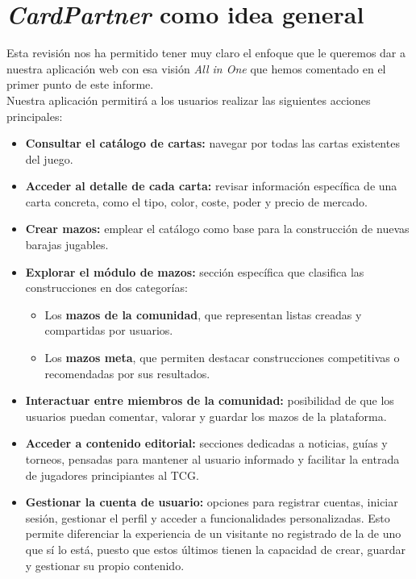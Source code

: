 \documentclass[10pt]{article}
\begin{document}
	\section{\textit{CardPartner} como idea general}        
	Esta revisión nos ha permitido tener muy claro el enfoque que le queremos dar a nuestra aplicación web
	con esa visión \textit{All in One} que hemos comentado en el primer punto de este informe.\\
	
	Nuestra aplicación permitirá a los usuarios realizar las siguientes acciones principales:
	\begin{itemize}
		\item \textbf{Consultar el catálogo de cartas:} navegar por todas las cartas existentes del juego.
		\item \textbf{Acceder al detalle de cada carta:} revisar información específica de una carta concreta, como el tipo, color, coste, poder y precio de mercado.
		\item \textbf{Crear mazos:} emplear el catálogo como base para la construcción de nuevas barajas jugables.
		\item \textbf{Explorar el módulo de mazos:} sección específica que clasifica las construcciones en dos categorías:
		\begin{itemize}
			\item Los \textbf{mazos de la comunidad}, que representan listas creadas y compartidas por usuarios.
			\item Los \textbf{mazos meta}, que permiten destacar construcciones competitivas o recomendadas por sus resultados.
		\end{itemize}
		\item \textbf{Interactuar entre miembros de la comunidad:} posibilidad de que los usuarios puedan comentar, valorar y guardar los mazos de la plataforma.
		\item \textbf{Acceder a contenido editorial:} secciones dedicadas a noticias, guías y torneos, pensadas para mantener al usuario informado y facilitar la entrada de jugadores principiantes al TCG.
		\item \textbf{Gestionar la cuenta de usuario:} opciones para registrar cuentas, iniciar sesión, gestionar el perfil y acceder a funcionalidades personalizadas. Esto permite diferenciar la experiencia de un visitante no registrado de la de uno que sí lo está, puesto que estos últimos tienen la capacidad de crear, guardar y gestionar su propio contenido.
	\end{itemize}
	
\end{document}
